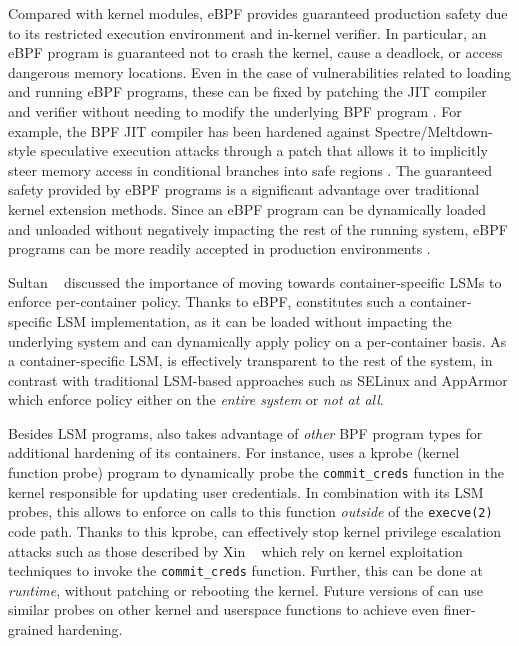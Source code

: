 Compared with kernel modules, eBPF provides guaranteed production safety due to its restricted execution environment and in-kernel verifier. In particular, an eBPF program is guaranteed not to crash the kernel, cause a deadlock, or access dangerous memory locations. Even in the case of vulnerabilities related to loading and running eBPF programs, these can be fixed by patching the JIT compiler and verifier without needing to modify the underlying BPF program \cite{gregg2019_bpf}. For example, the BPF JIT compiler has been hardened against Spectre/Meltdown-style speculative execution attacks \cite{kocher2019_spectre} through a patch that allows it to implicitly steer memory access in conditional branches into safe regions \cite{starovoitov2020_safe}. The guaranteed safety provided by eBPF programs is a significant advantage over traditional kernel extension methods. Since an eBPF program can be dynamically loaded and unloaded without negatively impacting the rest of the running system, eBPF programs can be more readily accepted in production environments \cite{gregg2019_bpf}.

Sultan \etal~\cite{sultan2019_container_security} discussed the importance of moving towards container-specific LSMs to enforce per-container policy. Thanks to eBPF, \bpfcontain{} constitutes such a container-specific LSM implementation, as it can be loaded without impacting the underlying system and can dynamically apply policy on a per-container basis. As a container-specific LSM, \bpfcontain{} is effectively transparent to the rest of the system, in contrast with traditional LSM-based approaches such as SELinux \cite{smalley2001_selinux} and AppArmor \cite{cowan2000_apparmor} which enforce policy either on the \textit{entire system} or \textit{not at all}.

Besides LSM programs, \bpfcontain{} also takes advantage of \textit{other} BPF program types for additional hardening of its containers. For instance, \bpfcontain{} uses a kprobe (kernel function probe) program to dynamically probe the \texttt{commit\_creds} function in the kernel responsible for updating user credentials. In combination with its LSM probes, this allows \bpfcontain{} to enforce on calls to this function \textit{outside} of the \texttt{execve(2)} code path. Thanks to this kprobe, \bpfcontain{} can effectively stop kernel privilege escalation attacks such as those described by Xin \etal~\cite{xin2018_container_security} which rely on kernel exploitation techniques to invoke the \texttt{commit\_creds} function. Further, this can be done at \textit{runtime}, without patching or rebooting the kernel. Future versions of \bpfcontain{} can use similar probes on other kernel and userspace functions to achieve even finer-grained hardening.
